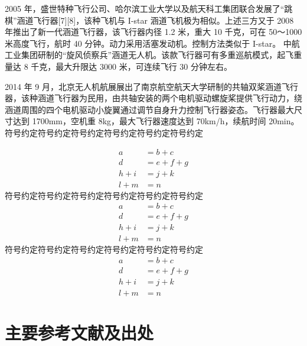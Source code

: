 \begin{ubox}
2005 年，盛世特种飞行公司、哈尔滨工业大学以及航天科工集团联合发展了“跳棋”涵道飞行器[7][8]，该种飞机与 I-star 涵道飞机极为相似。上述三方又于 2008 年推出了新一代涵道飞行器，该飞行器内径 1.2 米，重大 10 千克，可在 50～1000 米高度飞行，航时 40 分钟。动力采用活塞发动机。控制方法类似于 I-star。
中航工业集团研制的“旋风侦察兵”涵道无人机。该款飞行器可有多重巡航模式，起飞重量达 8 千克，最大升限达 3000 米，可连续飞行 30 分钟左右。

2014 年 9 月，北京无人机航展展出了南京航空航天大学研制的共轴双桨涵道飞行器，该种涵道飞行器为民用，由共轴安装的两个电机驱动螺旋桨提供飞行动力，绕涵道周围的四个电机驱动小旋翼通过调节自身升力控制飞行器姿态。飞行器最大尺寸达到 1700mm，空机重 8kg，最大飞行器速度达到 70km/h，续航时间 20min。
符号约定符号约定符号约定符号约定符号约定符号约定
\begin{table}[H]
	\centering
	\small
	\caption{数值}
\end{table}
\begin{equation}
	\begin{aligned}
		a &= b + c \\
		d &= e + f + g \\
		h + i &= j + k \\
		l + m &= n
	\end{aligned}
\end{equation}
符号约定符号约定符号约定符号约定符号约定符号约定
\begin{equation}
	\begin{aligned}
		a &= b + c \\
		d &= e + f + g \\
		h + i &= j + k \\
		l + m &= n
	\end{aligned}
\end{equation}
符号约定符号约定符号约定符号约定符号约定符号约定
\begin{equation}
	\begin{aligned}
		a &= b + c \\
		d &= e + f + g \\
		h + i &= j + k \\
		l + m &= n
	\end{aligned}
\end{equation}
\section{主要参考文献及出处}
\printbibliography[heading=none]
\end{ubox}

